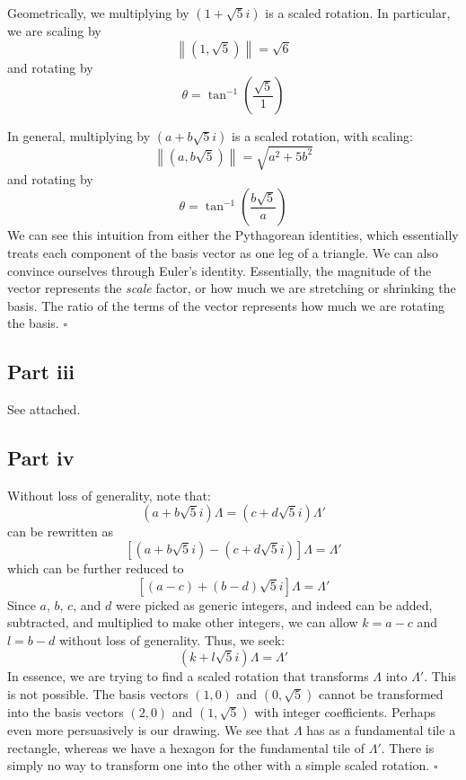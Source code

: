\documentclass[letterpaper]{article}
\newcommand*{\QED}{\hfill\ensuremath{\square}}%
\begin{document}
Geometrically, we multiplying by $ (1 + \sqrt{5} i) $ is a scaled rotation.
In particular, we are scaling by
\[
\left\lVert (1, \sqrt{5}) \right\rVert = \sqrt{6}
\]
and rotating by
\[
\theta = \tan^{-1}{\left(\frac{\sqrt{5}}{1}\right)}
\]

In general, multiplying by $ (a + b \sqrt{5} i) $ is a scaled rotation, with scaling:
\[
\left\lVert (a, b \sqrt{5}) \right\rVert = \sqrt{a^2 + 5 b^2}
\]
and rotating by
\[
\theta = \tan^{-1}{\left(\frac{b \sqrt{5}}{a}\right)}
\]
We can see this intuition from either the Pythagorean identities, which essentially treats each component of the basis vector as one leg of a triangle.
We can also convince ourselves through Euler's identity.
Essentially, the magnitude of the vector represents the \textit{scale} factor, or how much we are stretching or shrinking the basis.
The ratio of the terms of the vector represents how much we are rotating the basis.
\QED{}

\subsection{Part iii}
\label{sub:3Partiii}

See attached.

\subsection{Part iv}
\label{sub:3Partiv}

Without loss of generality, note that:
\[
(a + b\sqrt{5} i) \Lambda = (c + d\sqrt{5} i) \Lambda'
\]
can be rewritten as
\[
\left[(a + b\sqrt{5} i) - (c + d\sqrt{5} i) \right] \Lambda = \Lambda'
\]
which can be further reduced to
\[
\left[(a - c) + (b - d) \sqrt{5} i \right] \Lambda = \Lambda'
\]
Since $ a $, $ b $, $ c $, and $ d $ were picked as generic integers, and indeed can be added, subtracted, and multiplied to make other integers, we can allow $ k = a - c $ and $ l = b - d $ without loss of generality.
Thus, we seek:
\[
(k + l \sqrt{5} i) \Lambda = \Lambda'
\]
In essence, we are trying to find a scaled rotation that transforms $ \Lambda $ into $ \Lambda' $.
This is not possible.
The basis vectors $ (1, 0) $ and $ (0, \sqrt{5}) $ cannot be transformed into the basis vectors $ (2, 0) $ and $ (1, \sqrt{5}) $ with integer coefficients.
Perhaps even more persuasively is our drawing.
We see that $ \Lambda $ has as a fundamental tile a rectangle, whereas we have a hexagon for the fundamental tile of $ \Lambda' $.
There is simply no way to transform one into the other with a simple scaled rotation.
\QED{}
\end{document}

